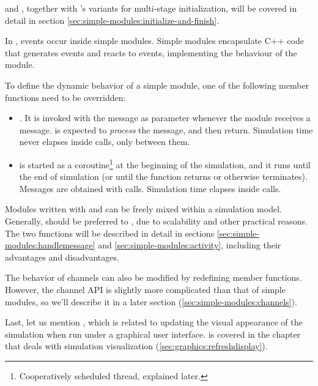  and , together with 's
variants for multi-stage initialization, will be covered in detail in
section \ref{sec:simple-modules:initialize-and-finish}.

In {\opp}, events occur inside simple modules.
Simple modules encapsulate C++ code that generates events and reacts to events,
implementing the behaviour of the module.

To define the dynamic behavior of a simple module, one of the following
member functions need to be overridden:

\begin{itemize}
  \item {}. It
     is invoked with the message as parameter whenever the
     module receives a message.  is
     expected to \textit{process} the message, and then return.
     Simulation time never elapses inside 
     calls, only between them.
  \item {} is started as a coroutine\footnote{Cooperatively
     scheduled thread, explained later.} at the beginning of the simulation, and
     it runs until the end of simulation (or until the function
     returns or otherwise terminates). Messages are obtained with
      calls. Simulation time elapses inside
      calls.
\end{itemize}

Modules written with  and  can be
freely mixed within a simulation model. Generally, 
should be preferred to , due to scalability and other
practical reasons. The two functions will be described in detail in sections
\ref{sec:simple-modules:handlemessage} and \ref{sec:simple-modules:activity},
including their advantages and disadvantages.

The behavior of channels can also be modified by redefining member functions.
However, the channel API is slightly more complicated than that of simple
modules, so we'll describe it in a later section (\ref{sec:simple-modules:channels}).

Last, let us mention , which is related to updating
the visual appearance of the simulation when run under a graphical user
interface.  is covered in the chapter that deals
with simulation visualization (\ref{sec:graphics:refreshdisplay}).

